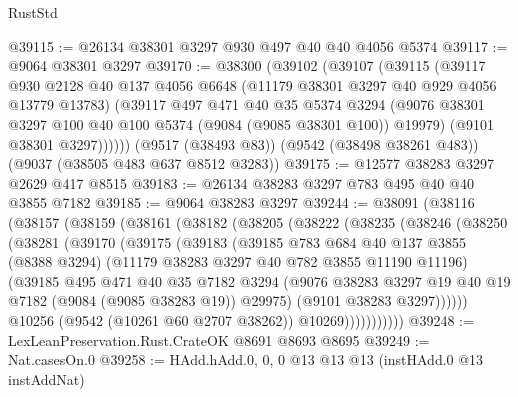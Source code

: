 \begin{lexlean}{RustStd}
\begin{coremodule}
@39115 := @26134 @38301 @3297 @930 @497 @40 @40 @4056 @5374
@39117 := @9064 @38301 @3297
@39170 := @38300
    (@39102
      (@39107
        (@39115
          (@39117
            @930
            @2128
            @40
            @137
            @4056
            @6648
            (@11179 @38301 @3297 @40 @929 @4056 @13779 @13783)
            (@39117
              @497
              @471
              @40
              @35
              @5374
              @3294
              (@9076 @38301 @3297 @100 @40 @100 @5374 (@9084 (@9085 @38301 @100)) @19979)
              (@9101 @38301 @3297))))))
    (@9517 (@38493 @83))
    (@9542 (@38498 @38261 @483))
    (@9037 (@38505 @483 @637 @8512 @3283))
@39175 := @12577 @38283 @3297 @2629 @417 @8515
@39183 := @26134 @38283 @3297 @783 @495 @40 @40 @3855 @7182
@39185 := @9064 @38283 @3297
@39244 := @38091
    (@38116
      (@38157
        (@38159
          (@38161
            (@38182
              (@38205
                (@38222
                  (@38235
                    (@38246
                      (@38250
                        (@38281
                          (@39170
                            (@39175
                              (@39183
                                (@39185
                                  @783
                                  @684
                                  @40
                                  @137
                                  @3855
                                  (@8388 @3294)
                                  (@11179 @38283 @3297 @40 @782 @3855 @11190 @11196)
                                  (@39185
                                    @495
                                    @471
                                    @40
                                    @35
                                    @7182
                                    @3294
                                    (@9076
                                      @38283
                                      @3297
                                      @19
                                      @40
                                      @19
                                      @7182
                                      (@9084 (@9085 @38283 @19))
                                      @29975)
                                    (@9101 @38283 @3297))))))
                          @10256
                          (@9542 (@10261 @60 @2707 @38262))
                          @10269)))))))))))
@39248 := LexLeanPreservation.Rust.CrateOK @8691 @8693 @8695
@39249 := Nat.casesOn.{0}
@39258 := HAdd.hAdd.{0, 0, 0} @13 @13 @13 (instHAdd.{0} @13 instAddNat)

\end{coremodule}
\end{lexlean}
